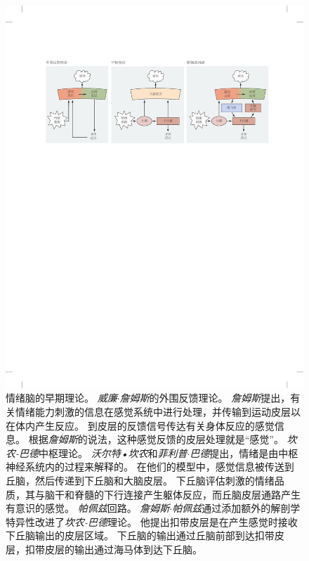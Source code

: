 \begin{figure}[htbp]
	\centering
	\includegraphics[width=1.0\linewidth]{chap42/fig_42_2}
	\caption{情绪脑的早期理论\cite{ledoux1997emotional}。
		\textit{威廉$\cdot$詹姆斯}的外围反馈理论。
		\textit{詹姆斯}提出，有关情绪能力刺激的信息在感觉系统中进行处理，并传输到运动皮层以在体内产生反应。
		到皮层的反馈信号传达有关身体反应的感觉信息。
		根据\textit{詹姆斯}的说法，这种感觉反馈的皮层处理就是“感觉”。
		\textit{坎农-巴德}中枢理论。
		\textit{沃尔特•坎农}和\textit{菲利普$\cdot$巴德}提出，情绪是由中枢神经系统内的过程来解释的。
		在他们的模型中，感觉信息被传送到丘脑，然后传递到下丘脑和大脑皮层。
		下丘脑评估刺激的情绪品质，其与脑干和脊髓的下行连接产生躯体反应，而丘脑皮层通路产生有意识的感觉。
		\textit{帕佩兹}回路。
		\textit{詹姆斯$\cdot$帕佩兹}通过添加额外的解剖学特异性改进了\textit{坎农-巴德}理论。
		他提出扣带皮层是在产生感觉时接收下丘脑输出的皮层区域。
		下丘脑的输出通过丘脑前部到达扣带皮层，扣带皮层的输出通过海马体到达下丘脑。}
	\label{fig:42_2}
\end{figure}


